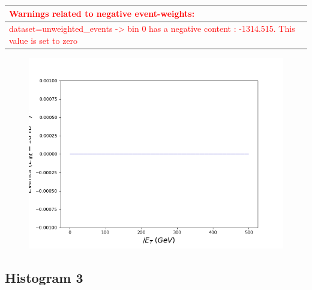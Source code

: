 \documentclass[a4paper, 10pt]{article}
\begin{document}
\begin{table}[H]
  \begin{center}
    \begin{tabular}{|m{140.0mm}|}
      \hline
      {\cellcolor{white}\textcolor{red}{Warnings related to negative event-weights:}}\\
      \hline
      {\cellcolor{white}\textcolor{red}{dataset=unweighted\_events -> bin 0 has a negative content : -1314.515. This value is set to zero}}\\
      \hline
\hline
    \end{tabular}
  \end{center}
\end{table}

\begin{figure}[H]
  \begin{center}
    \includegraphics[scale=0.45]{selection_1.png}\\
\caption{   }
  \end{center}
\end{figure}
      \newpage
\subsection{ Histogram 3}
\end{document}
